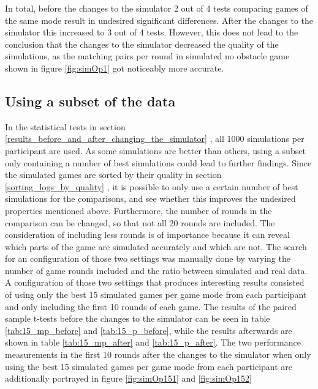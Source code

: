 In total, before the changes to the simulator 2 out of 4 tests comparing games of the same mode result in undesired significant differences. After the changes to the simulator this increased to 3 out of 4 tests. However, this does not lead to the conclusion that the changes to the simulator decreased the quality of the simulations, as the matching pairs per round in simulated no obstacle game shown in figure \ref{fig:simOp1} got noticeably more accurate.

\subsection{Using a subset of the data}
\label{search_for_a_subset}
In the statistical tests in section \ref{results_before_and_after_changing_the_simulator} , all 1000 simulations per participant are used. As some simulations are better than others, using a subset only containing a number of best simulations could lead to further findings. Since the simulated games are sorted by their quality in section \ref{sorting_logs_by_quality} , it is possible to only use a certain number of best simulations for the comparisons, and see whether this improves the undesired properties mentioned above. Furthermore, the number of rounds in the comparison can be changed, so that not all 20 rounds are included. The consideration of including less rounds is of importance because it can reveal which parts of the game are simulated accurately and which are not. The search for an configuration of those two settings was manually done by varying the number of game rounds included and the ratio between simulated and real data. A configuration of those two settings that produces interesting results consisted of using only the best 15 simulated games per game mode from each participant and only including the first 10 rounds of each game. The results of the paired sample t-tests before the changes to the simulator can be seen in table \ref{tab:15_mp_before} and \ref{tab:15_p_before}, while the results afterwards are shown in table \ref{tab:15_mp_after} and \ref{tab:15_p_after}. The two performance measurements in the first 10 rounds after the changes to the simulator when only using the best 15 simulated games per game mode from each participant are additionally portrayed in figure \ref{fig:simOp151} and \ref{fig:simOp152}
\newpage

